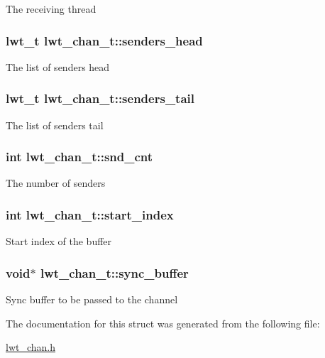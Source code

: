 The receiving thread \hypertarget{structlwt__channel_ad839ac9ea47e3a6ee79dc14d2773d3a3}{
\subsubsection[{senders\+\_\+head}]{\setlength{\rightskip}{0pt plus 5cm}lwt\+\_\+t lwt\+\_\+chan\+\_\+t\+::senders\+\_\+head}}\label{structlwt__channel_ad839ac9ea47e3a6ee79dc14d2773d3a3}
The list of senders head \hypertarget{structlwt__channel_a24de7786f0a6b38d6c3fe6bc18947f2e}{
\subsubsection[{senders\+\_\+tail}]{\setlength{\rightskip}{0pt plus 5cm}lwt\+\_\+t lwt\+\_\+chan\+\_\+t\+::senders\+\_\+tail}}\label{structlwt__channel_a24de7786f0a6b38d6c3fe6bc18947f2e}
The list of senders tail \hypertarget{structlwt__channel_ab7687f6e58c0d4cb4c2de7db501fb046}{
\subsubsection[{snd\+\_\+cnt}]{\setlength{\rightskip}{0pt plus 5cm}int lwt\+\_\+chan\+\_\+t\+::snd\+\_\+cnt}}\label{structlwt__channel_ab7687f6e58c0d4cb4c2de7db501fb046}
The number of senders \hypertarget{structlwt__channel_a722d06e3fd594282b001e14d61ba4d33}{
\subsubsection[{start\+\_\+index}]{\setlength{\rightskip}{0pt plus 5cm}int lwt\+\_\+chan\+\_\+t\+::start\+\_\+index}}\label{structlwt__channel_a722d06e3fd594282b001e14d61ba4d33}
Start index of the buffer \hypertarget{structlwt__channel_a19260280268d501a8e6d341c21eba961}{
\subsubsection[{sync\+\_\+buffer}]{\setlength{\rightskip}{0pt plus 5cm}void$\ast$ lwt\+\_\+chan\+\_\+t\+::sync\+\_\+buffer}}\label{structlwt__channel_a19260280268d501a8e6d341c21eba961}
Sync buffer to be passed to the channel 

The documentation for this struct was generated from the following file\+:\begin{DoxyCompactItemize}
\item 
\hyperlink{lwt__chan_8h}{lwt\+\_\+chan.\+h}\end{DoxyCompactItemize}
